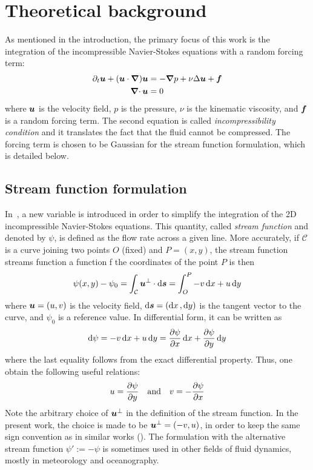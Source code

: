 \documentclass[../main.tex]{subfiles}
\begin{document}
\section{Theoretical background}
As mentioned in the introduction, the primary focus of this work is the integration of the incompressible Navier-Stokes equations with a random forcing term:
\begin{align}
	\label{eq:navier-stokes}\partial_t \boldsymbol{u} + (\boldsymbol{u} \cdot \grad) \boldsymbol{u} & = -\grad p + \nu\Delta \boldsymbol{u} + \boldsymbol{f} \\
	\label{eq:incompressibility}\operatorname{\boldsymbol{\nabla}\cdot}{\boldsymbol{u}}                               & = 0
\end{align}
where $\boldsymbol{u}$ is the velocity field, $p$ is the pressure, $\nu$ is the kinematic viscosity, and $\boldsymbol{f}$ is a random forcing term. The second equation is called	\emph{incompressibility condition} and it translates the fact that the fluid cannot be compressed.
The forcing term is chosen to be Gaussian for the stream function formulation, which is detailed below.

\subsection{Stream function formulation}
In~\cite{Batchelor2000}, a new variable is introduced in order to simplify the integration of the 2D incompressible Navier-Stokes equations. This quantity, called \emph{stream function} and denoted by $\psi$, is defined as the flow rate across a given line. More accurately, if $\mathcal{C}$ is a curve joining two points $O$ (fixed) and $P=(x,y)$, the stream function streams function a function f the coordinates of the point $P$ is then
\begin{equation}
	\psi(x,y) -\psi_0 = \int_{\mathcal{C}} \boldsymbol{u}^\perp \cdot \dd{\boldsymbol{s}}= \int_{O}^{P} -v \dd{x} + u \dd{y}
\end{equation}
where $\boldsymbol{u} = (u,v)$ is the velocity field, $\dd{\boldsymbol{s}}=(\dd{x},\dd{y})$ is the tangent vector to the curve, and $\psi_0$ is a reference value. In differential form, it can be written as
\begin{equation}
	\dd{\psi} = -v \dd{x} + u \dd{y} = \pdv{\psi}{x} \dd{x} + \pdv{\psi}{y} \dd{y}
\end{equation}
where the last equality follows from the exact differential property. Thus, one obtain the following useful relations:
\begin{equation}
	u = \pdv{\psi}{y} \quad \text{and} \quad v = -\pdv{\psi}{x}
\end{equation}
Note the arbitrary choice of $\boldsymbol{u}^\perp$ in the definition of the stream function. In the present work, the choice is made to be $\boldsymbol{u}^\perp = (-v,u)$, in order to keep the same sign convention as in similar works (\cite{2dturbulence,alexakisLONG}). The formulation with the alternative stream function $\psi':=-\psi$ is sometimes used in other fields of fluid dynamics, mostly in meteorology and oceanography.
\end{document}
